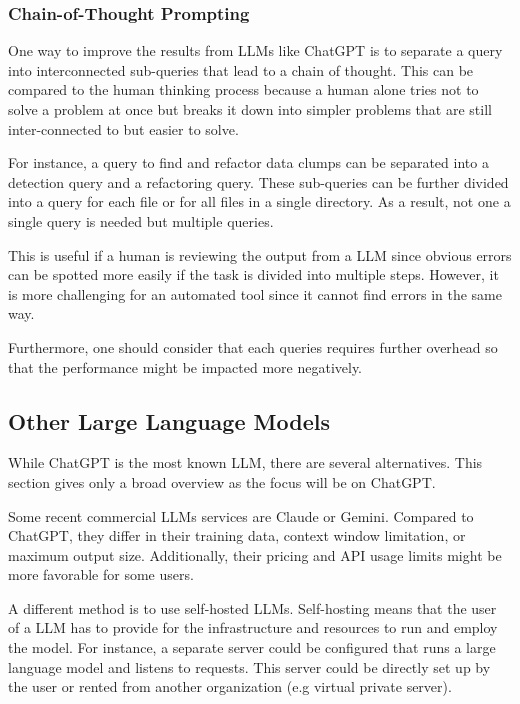 \subsubsection{Chain-of-Thought Prompting}\label{sec:chain of thought}

One way to improve the results from \acp{LLM} like ChatGPT is to separate a query into interconnected sub-queries that lead to a chain of thought. This can be compared to the human thinking process because a human alone tries not to solve a problem at once but breaks it down into simpler problems that are still inter-connected to but easier to solve. \cite{Wei2022ChainOT}

For instance, a query to find and refactor data clumps can be separated into a detection query and a refactoring query. These sub-queries can be further divided into a query for each file or for all files in a single directory. As a result, not one a single query is needed but multiple queries. 

This is useful if a human is reviewing the output from a \ac{LLM} since obvious errors can be spotted more easily if the task is divided into multiple steps. However, it is more challenging for an automated tool since it cannot find errors in the same way. 

Furthermore, one should consider that each queries requires further overhead so that the performance might be impacted more negatively. 




\subsection{Other Large Language Models}

While ChatGPT is the most known \ac{LLM}, there are several alternatives. This section gives only a broad overview as the focus will be on ChatGPT.

Some recent commercial \acp{LLM} services are Claude or Gemini. Compared to ChatGPT, they differ in their training data, context window limitation, or maximum output size. Additionally, their pricing and API usage limits might be more favorable for some users.

A different method  is to use self-hosted \acp{LLM}.
Self-hosting means that the user of a \ac{LLM} has to provide for the infrastructure and resources to run and employ the model. For instance, a separate server could be configured that runs a large language model and listens to requests. This server could be directly set up by the user or rented from another organization (e.g virtual private server). 

